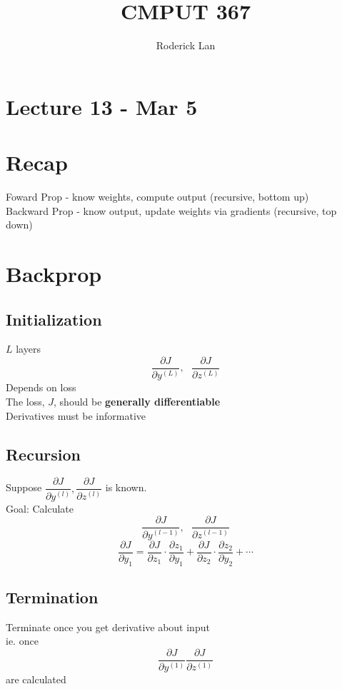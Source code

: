 \documentclass{article}
\title{CMPUT 367}
\author{Roderick Lan}
\date{}
\begin{document}
\maketitle

\tableofcontents
\break

\section*{Lecture 13 - Mar 5}



\section{Recap}
Foward Prop - know weights, compute output (recursive, bottom up)
\\
Backward Prop - know output, update weights via gradients (recursive, top down)



\section{Backprop}
\subsection*{Initialization}
$L$ layers \[
    \dfrac{\partial J}{\partial y^{(L)}}, \ \ \ \dfrac{\partial J}{\partial z^{(L)}}
\]
Depends on loss
\\
The loss, $J$, should be \textbf{generally differentiable}
\\
Derivatives must be informative 

\subsection*{Recursion}
Suppose $\dfrac{\partial J}{\partial y^{(l)}}, \dfrac{\partial J}{\partial z^{(l)}}$
is known. 
\\[10pt]
Goal: Calculate \[
    \dfrac{\partial J}{\partial y^{(l-1)}}, \ \ \ \dfrac{\partial J}{\partial z^{(l-1)}}
\]
\[
    \dfrac{\partial J}{\partial y_1} = 
    \dfrac{\partial J}{\partial z_1} \cdot \dfrac{\partial z_1}{\partial y_1}+
    \dfrac{\partial J}{\partial z_2} \cdot \dfrac{\partial z_2}{\partial y_2}
    +\cdots 
\]




\subsection*{Termination}
Terminate once you get derivative about input\\
ie. once
\[
    \dfrac{\partial J}{\partial y^{(1)}} \dfrac{\partial J}{\partial z^{(1)}}
\] are calculated
\end{document}
